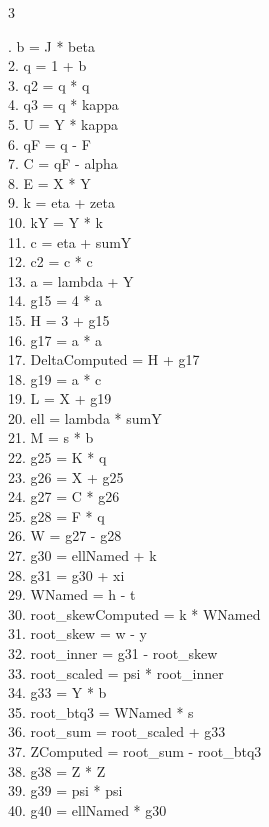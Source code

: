 \documentclass[10pt]{article}
\begin{document}
\begin{multicols}{3}
\raggedright\ttfamily\fontsize{6.2}{7.1}. b = J * beta\\
2. q = 1 + b\\
3. q2 = q * q\\
4. q3 = q * kappa\\
5. U = Y * kappa\\
6. qF = q - F\\
7. C = qF - alpha\\
8. E = X * Y\\
9. k = eta + zeta\\
10. kY = Y * k\\
11. c = eta + sumY\\
12. c2 = c * c\\
13. a = lambda + Y\\
14. g15 = 4 * a\\
15. H = 3 + g15\\
16. g17 = a * a\\
17. DeltaComputed = H + g17\\
18. g19 = a * c\\
19. L = X + g19\\
20. ell = lambda * sumY\\
21. M = s * b\\
22. g25 = K * q\\
23. g26 = X + g25\\
24. g27 = C * g26\\
25. g28 = F * q\\
26. W = g27 - g28\\
27. g30 = ellNamed + k\\
28. g31 = g30 + xi\\
29. WNamed = h - t\\
30. root\_skewComputed = k * WNamed\\
31. root\_skew = w - y\\
32. root\_inner = g31 - root\_skew\\
33. root\_scaled = psi * root\_inner\\
34. g33 = Y * b\\
35. root\_btq3 = WNamed * s\\
36. root\_sum = root\_scaled + g33\\
37. ZComputed = root\_sum - root\_btq3\\
38. g38 = Z * Z\\
39. g39 = psi * psi\\
40. g40 = ellNamed * g30\\

\end{multicols}
\end{document}

